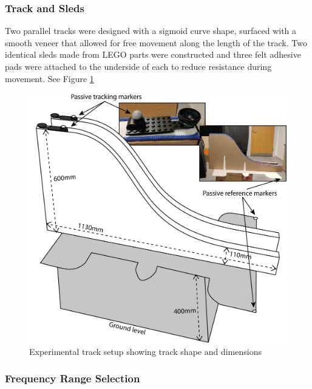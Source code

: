 \documentclass[10pt,a4paper,onecolumn]{article}
\begin{document}
\hypertarget{track-and-sleds}{%
\subsubsection{Track and Sleds}\label{track-and-sleds}}

Two parallel tracks were designed with a sigmoid curve shape, surfaced with a smooth veneer that allowed for free movement along the length of the track. Two identical sleds made from LEGO parts were constructed and three felt adhesive pads were attached to the underside of each to reduce resistance during movement. See Figure \ref{fig:track-setup}

\begin{figure}

{\centering \includegraphics[width=1\linewidth]{figures/track_dimensions} 

}

\caption{Experimental track setup showing track shape and dimensions}\label{fig:track-setup}
\end{figure}

\hypertarget{frequency-range-selection}{%
\subsubsection{Frequency Range Selection}\label{frequency-range-selection}}
\end{document}

